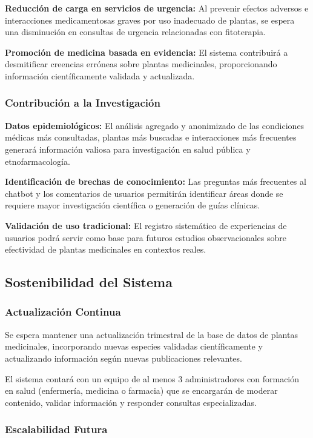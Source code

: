 \documentclass[12pt,a4paper]{article}
\begin{document}
\textbf{Reducción de carga en servicios de urgencia:} Al prevenir efectos adversos e interacciones medicamentosas graves por uso inadecuado de plantas, se espera una disminución en consultas de urgencia relacionadas con fitoterapia.

\textbf{Promoción de medicina basada en evidencia:} El sistema contribuirá a desmitificar creencias erróneas sobre plantas medicinales, proporcionando información científicamente validada y actualizada.

\subsubsection{Contribución a la Investigación}

\textbf{Datos epidemiológicos:} El análisis agregado y anonimizado de las condiciones médicas más consultadas, plantas más buscadas e interacciones más frecuentes generará información valiosa para investigación en salud pública y etnofarmacología.

\textbf{Identificación de brechas de conocimiento:} Las preguntas más frecuentes al chatbot y los comentarios de usuarios permitirán identificar áreas donde se requiere mayor investigación científica o generación de guías clínicas.

\textbf{Validación de uso tradicional:} El registro sistemático de experiencias de usuarios podrá servir como base para futuros estudios observacionales sobre efectividad de plantas medicinales en contextos reales.

\subsection{Sostenibilidad del Sistema}

\subsubsection{Actualización Continua}

Se espera mantener una actualización trimestral de la base de datos de plantas medicinales, incorporando nuevas especies validadas científicamente y actualizando información según nuevas publicaciones relevantes.

El sistema contará con un equipo de al menos 3 administradores con formación en salud (enfermería, medicina o farmacia) que se encargarán de moderar contenido, validar información y responder consultas especializadas.

\subsubsection{Escalabilidad Futura}
\end{document}

